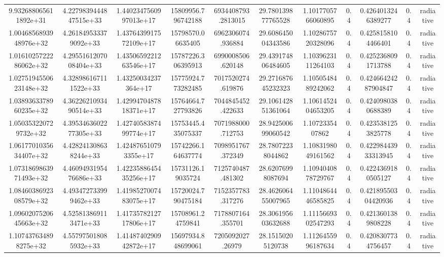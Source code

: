 \begin{table}
\begin{tabular}{ccccccccccc}
9.932688065611892e+31 & 4.2279839444847515e+33 & 1.4402347560997013e+17 & 15809956.796742188 & 6934408793.2813015 & 29.780139877765528 & 1.1017705766060895 & 0.4 & 0.4264013246389277 & 0.4 & radiative \\
1.0046856893948976e+32 & 4.261849533379092e+33 & 1.4376439917572109e+17 & 15798570.06635405 & 6962306074.936884 & 29.608645004343586 & 1.1028675720328096 & 0.4 & 0.4258158104466401 & 0.4 & radiative \\
1.0161025722286062e+32 & 4.2955161207008404e+33 & 1.4350659221263546e+17 & 15787226.306395913 & 6990008506.620148 & 29.439174806484605 & 1.1039623111264103 & 0.4 & 0.4252368091713788 & 0.4 & radiative \\
1.0275194550623148e+32 & 4.328986167111522e+33 & 1.43250034237364e+17 & 15775924.773282485 & 7017520274.619876 & 29.271687645232323 & 1.1050548489242062 & 0.4 & 0.42466424287904847 & 0.4 & radiative \\
1.0389363378960235e+32 & 4.3622621093490514e+33 & 1.4299470487818371e+17 & 15764664.727793826 & 7044845452.422633 & 29.106142851361064 & 1.1061452404653205 & 0.4 & 0.4240980380688389 & 0.4 & radiative \\
1.050353220729732e+32 & 4.3953463602277305e+33 & 1.4274058387499774e+17 & 15753445.435075337 & 7071988000.712753 & 28.942500699060542 & 1.1072335407862 & 0.4 & 0.4235381253825778 & 0.4 & radiative \\
1.0617701035634407e+32 & 4.428241308638244e+33 & 1.424876510793355e+17 & 15742266.164637774 & 7098951767.372349 & 28.78072238044862 & 1.1083198049161562 & 0.4 & 0.42298443933313945 & 0.4 & radiative \\
1.0731869863971493e+32 & 4.4609493195476686e+33 & 1.4223588645435256e+17 & 15731126.19035724 & 7125740487.481302 & 28.62076998087694 & 1.1094040878729767 & 0.4 & 0.4224369180505127 & 0.4 & radiative \\
1.0846038692308579e+32 & 4.493472733999462e+33 & 1.4198527007483075e+17 & 15720024.790475184 & 7152357783.317276 & 28.462606455007965 & 1.1104864446585825 & 0.4 & 0.42189550304420936 & 0.4 & radiative \\
1.0960207520645663e+32 & 4.525813869113471e+33 & 1.4173578212717806e+17 & 15708961.24759841 & 7178807164.355701 & 28.306195603632688 & 1.1115669302547293 & 0.4 & 0.4213601389808228 & 0.4 & radiative \\
1.107437634898275e+32 & 4.557975018085932e+33 & 1.4148740290942872e+17 & 15697934.848699061 & 7205092027.26979 & 28.15150205120738 & 1.1126455996187634 & 0.4 & 0.4208307734756457 & 0.4 & radiative \\

\end{tabular}
\end{table}
